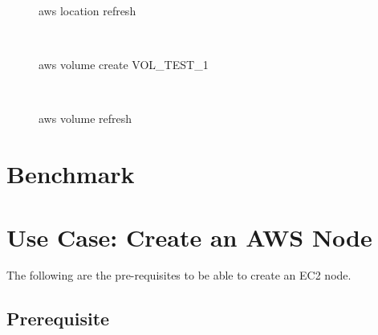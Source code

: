 \documentclass[9pt,twocolumn,twoside]{../../styles/osajnl}
\begin{document}
\begin{figure}[htb]
  \centering
  \caption{aws location refresh}
  \label{fig:locationlist}
~\newline

  \centering
  \caption{aws volume create VOL\_TEST\_1}
  \label{fig:createvolume}
~\newline

  \centering
  \caption{aws volume refresh}
  \label{fig:volumelist}
\end{figure}
    
\section{Benchmark}


\section{Use Case: Create an AWS Node}
	The following are the pre-requisites to be able to create an EC2 node.

\subsection{Prerequisite}
\end{document}
